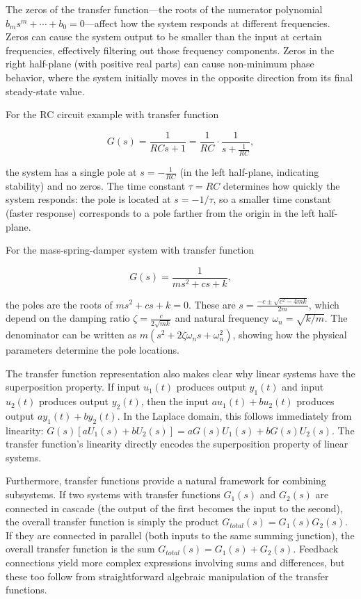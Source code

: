 The zeros of the transfer function---the roots of the numerator polynomial $b_m s^m + \cdots + b_0 = 0$---affect how the system responds at different frequencies. Zeros can cause the system output to be smaller than the input at certain frequencies, effectively filtering out those frequency components. Zeros in the right half-plane (with positive real parts) can cause non-minimum phase behavior, where the system initially moves in the opposite direction from its final steady-state value.

\begin{example}
For the RC circuit example with transfer function

\[
G(s) = \frac{1}{RCs + 1} = \frac{1}{RC} \cdot \frac{1}{s + \frac{1}{RC}},
\]

the system has a single pole at $s = -\frac{1}{RC}$ (in the left half-plane, indicating stability) and no zeros. The time constant $\tau = RC$ determines how quickly the system responds: the pole is located at $s = -1/\tau$, so a smaller time constant (faster response) corresponds to a pole farther from the origin in the left half-plane.

For the mass-spring-damper system with transfer function

\[
G(s) = \frac{1}{ms^2 + cs + k},
\]

the poles are the roots of $ms^2 + cs + k = 0$. These are $s = \frac{-c \pm \sqrt{c^2 - 4mk}}{2m}$, which depend on the damping ratio $\zeta = \frac{c}{2\sqrt{mk}}$ and natural frequency $\omega_n = \sqrt{k/m}$. The denominator can be written as $m(s^2 + 2\zeta\omega_n s + \omega_n^2)$, showing how the physical parameters determine the pole locations.
\end{example}

The transfer function representation also makes clear why linear systems have the superposition property. If input $u_1(t)$ produces output $y_1(t)$ and input $u_2(t)$ produces output $y_2(t)$, then the input $a u_1(t) + b u_2(t)$ produces output $a y_1(t) + b y_2(t)$. In the Laplace domain, this follows immediately from linearity: $G(s)[a U_1(s) + b U_2(s)] = a G(s) U_1(s) + b G(s) U_2(s)$. The transfer function's linearity directly encodes the superposition property of linear systems.

Furthermore, transfer functions provide a natural framework for combining subsystems. If two systems with transfer functions $G_1(s)$ and $G_2(s)$ are connected in cascade (the output of the first becomes the input to the second), the overall transfer function is simply the product $G_{total}(s) = G_1(s) G_2(s)$. If they are connected in parallel (both inputs to the same summing junction), the overall transfer function is the sum $G_{total}(s) = G_1(s) + G_2(s)$. Feedback connections yield more complex expressions involving sums and differences, but these too follow from straightforward algebraic manipulation of the transfer functions.

